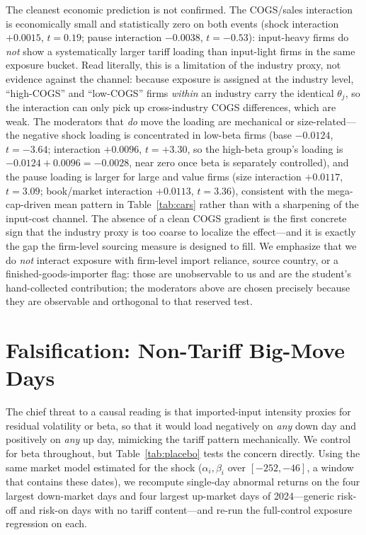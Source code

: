 \documentclass[12pt]{article}
\begin{document}
The cleanest economic prediction is not confirmed. The COGS/sales interaction is economically
small and statistically zero on both events (shock interaction $+0.0015$, $t=0.19$; pause
interaction $-0.0038$, $t=-0.53$): input-heavy firms do \emph{not} show a systematically larger
tariff loading than input-light firms in the same exposure bucket. Read literally, this is a
limitation of the industry proxy, not evidence against the channel: because exposure is
assigned at the industry level, ``high-COGS'' and ``low-COGS'' firms \emph{within} an industry
carry the identical $\theta_j$, so the interaction can only pick up cross-industry COGS
differences, which are weak. The moderators that \emph{do} move the loading are mechanical or
size-related---the negative shock loading is concentrated in low-beta firms (base $-0.0124$,
$t=-3.64$; interaction $+0.0096$, $t=+3.30$, so the high-beta group's loading is
$-0.0124+0.0096=-0.0028$, near zero once beta is separately controlled), and the pause loading
is larger for large and value firms
(size interaction $+0.0117$, $t=3.09$; book/market interaction $+0.0113$, $t=3.36$),
consistent with the mega-cap-driven mean pattern in Table~\ref{tab:cars} rather than with a
sharpening of the input-cost channel. The absence of a clean COGS gradient is the first
concrete sign that the industry proxy is too coarse to localize the effect---and it is exactly
the gap the firm-level sourcing measure is designed to fill. We emphasize that we do
\emph{not} interact exposure with firm-level import reliance, source country, or a
finished-goods-importer flag: those are unobservable to us and are the student's hand-collected
contribution; the moderators above are chosen precisely because they are observable and
orthogonal to that reserved test.

\section{Falsification: Non-Tariff Big-Move Days}\label{sec:placebo}
The chief threat to a causal reading is that imported-input intensity proxies for residual
volatility or beta, so that it would load negatively on \emph{any} down day and positively on
\emph{any} up day, mimicking the tariff pattern mechanically. We control for beta throughout,
but Table~\ref{tab:placebo} tests the concern directly. Using the same market model estimated
for the shock ($\alpha_i,\beta_i$ over $[-252,-46]$, a window that contains these dates), we
recompute single-day abnormal returns on the four largest down-market days and four largest
up-market days of 2024---generic risk-off and risk-on days with no tariff content---and re-run
the full-control exposure regression on each.
\end{document}

